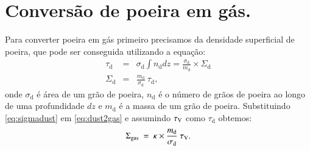 \section{Conversão de poeira em gás.}
\label{sec:gasfrac:gas2dust}

Para converter poeira em gás primeiro precisamos da densidade superficial de poeira, que pode ser
conseguida utilizando a equação:
\begin{eqnarray}
	\tau_{\mathrm{d}} &=& \sigma_{\mathrm{d}} \int n_{\mathrm{d}} dz =
	\frac{\sigma_{\mathrm{d}}}{m_{\mathrm{d}}}\times\Sigma_{\mathrm{d}}
	\\
	\Sigma_{\mathrm{d}} &=& \frac{m_{\mathrm{d}}}{\sigma_{\mathrm{d}}}\ \tau_{\mathrm{d}},
	\label{eq:sigmadust}
\end{eqnarray}
\noindent onde $\sigma_{\mathrm{d}}$ é área de um grão de poeira, $n_{\mathrm{d}}$ é o número de
grãos de poeira ao longo de uma profundidade $dz$ e $m_{\mathrm{d}}$ é a massa de um grão de
poeira. Substituindo \eqref{eq:sigmadust} em \eqref{eq:dust2gas} e assumindo $\tau_{\mathrm{V}}$ como
$\tau_{\mathrm{d}}$ obtemos:
\begin{equation}
	\Sigma_{\mathrm{gas}}\ =\ \kappa \times \frac{m_{\mathrm{d}}}{\sigma_{\mathrm{d}}}\ \tau_{\mathrm{V}}. 
	\label{eq:dust2gas_tauV}
\end{equation}

